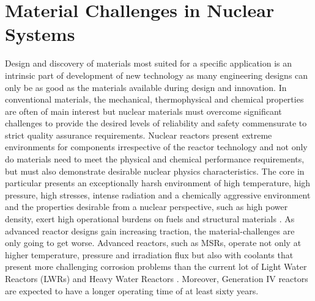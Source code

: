 \section{Material Challenges in Nuclear Systems}
	Design and discovery of materials most suited for a specific application is an intrinsic part of development of new technology as many engineering designs can only be as good as the materials available during design and innovation. In conventional materials, the mechanical, thermophysical and chemical properties are often of main interest but nuclear materials must overcome significant challenges to provide the desired levels of reliability and safety commensurate to strict quality assurance requirements. Nuclear reactors present extreme environments for components irrespective of the reactor technology and not only do materials need to meet the physical and chemical performance requirements, but must also demonstrate desirable nuclear physics characteristics. The core in particular presents an exceptionally harsh environment of high temperature, high pressure, high stresses, intense radiation and a chemically aggressive environment and the properties desirable from a nuclear perspective, such as high power density, exert high operational burdens on fuels and structural materials \cite{Zinkle:2013aa}.  As advanced reactor designs gain increasing traction, the material-challenges are only going to get worse. Advanced reactors, such as MSRs, operate not only at higher temperature, pressure and irradiation flux but also with coolants that present more challenging corrosion problems than the current lot of Light Water Reactors (LWRs) and Heavy Water Reactors \cite{Allen:2010aa}. Moreover, Generation {IV}  reactors are expected to have a longer operating time of at least sixty years.
 
